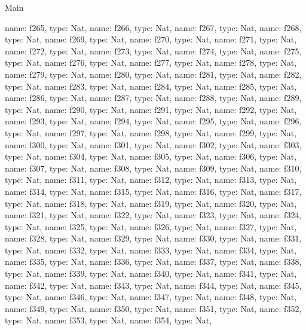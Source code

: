 \begin{lexlean}{Main}
\begin{semanticmodule}
{    {name: f265, type: Nat},
    {name: f266, type: Nat},
    {name: f267, type: Nat},
    {name: f268, type: Nat},
    {name: f269, type: Nat},
    {name: f270, type: Nat},
    {name: f271, type: Nat},
    {name: f272, type: Nat},
    {name: f273, type: Nat},
    {name: f274, type: Nat},
    {name: f275, type: Nat},
    {name: f276, type: Nat},
    {name: f277, type: Nat},
    {name: f278, type: Nat},
    {name: f279, type: Nat},
    {name: f280, type: Nat},
    {name: f281, type: Nat},
    {name: f282, type: Nat},
    {name: f283, type: Nat},
    {name: f284, type: Nat},
    {name: f285, type: Nat},
    {name: f286, type: Nat},
    {name: f287, type: Nat},
    {name: f288, type: Nat},
    {name: f289, type: Nat},
    {name: f290, type: Nat},
    {name: f291, type: Nat},
    {name: f292, type: Nat},
    {name: f293, type: Nat},
    {name: f294, type: Nat},
    {name: f295, type: Nat},
    {name: f296, type: Nat},
    {name: f297, type: Nat},
    {name: f298, type: Nat},
    {name: f299, type: Nat},
    {name: f300, type: Nat},
    {name: f301, type: Nat},
    {name: f302, type: Nat},
    {name: f303, type: Nat},
    {name: f304, type: Nat},
    {name: f305, type: Nat},
    {name: f306, type: Nat},
    {name: f307, type: Nat},
    {name: f308, type: Nat},
    {name: f309, type: Nat},
    {name: f310, type: Nat},
    {name: f311, type: Nat},
    {name: f312, type: Nat},
    {name: f313, type: Nat},
    {name: f314, type: Nat},
    {name: f315, type: Nat},
    {name: f316, type: Nat},
    {name: f317, type: Nat},
    {name: f318, type: Nat},
    {name: f319, type: Nat},
    {name: f320, type: Nat},
    {name: f321, type: Nat},
    {name: f322, type: Nat},
    {name: f323, type: Nat},
    {name: f324, type: Nat},
    {name: f325, type: Nat},
    {name: f326, type: Nat},
    {name: f327, type: Nat},
    {name: f328, type: Nat},
    {name: f329, type: Nat},
    {name: f330, type: Nat},
    {name: f331, type: Nat},
    {name: f332, type: Nat},
    {name: f333, type: Nat},
    {name: f334, type: Nat},
    {name: f335, type: Nat},
    {name: f336, type: Nat},
    {name: f337, type: Nat},
    {name: f338, type: Nat},
    {name: f339, type: Nat},
    {name: f340, type: Nat},
    {name: f341, type: Nat},
    {name: f342, type: Nat},
    {name: f343, type: Nat},
    {name: f344, type: Nat},
    {name: f345, type: Nat},
    {name: f346, type: Nat},
    {name: f347, type: Nat},
    {name: f348, type: Nat},
    {name: f349, type: Nat},
    {name: f350, type: Nat},
    {name: f351, type: Nat},
    {name: f352, type: Nat},
    {name: f353, type: Nat},
    {name: f354, type: Nat},
}
\end{semanticmodule}
\end{lexlean}

